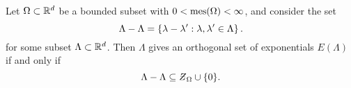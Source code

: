 \documentclass[../thesis.tex]{subfiles}
\begin{document}
\begin{lemma}\label{lem:zero_set_orthoganl_general}
    Let $\Omega \subset \mathbb{R}^d$ be a bounded subset with $0< \operatorname{mes}(\Omega)<\infty$, and consider the set
    \begin{equation}\label{eq:zero_set_orthogonal}
        \Lambda - \Lambda = \left\{\lambda-\lambda' : \lambda,\lambda' \in \Lambda\right\}.
    \end{equation}
    for some subset $\Lambda\subset \mathbb{R}^d$. Then $\Lambda$ gives an orthogonal set of exponentials $E(\Lambda)$ if and only if
    \begin{equation}\label{eq:zero_set_inclusion_original}
        \Lambda - \Lambda \subseteq \Zstroke_{\Omega} \cup \braq{0}.
    \end{equation}
\end{lemma}
\end{document}
